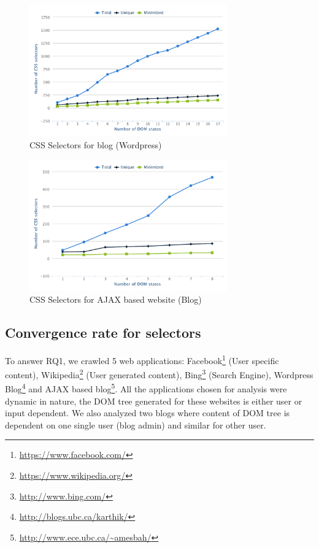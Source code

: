 	\begin{figure}
		\centering
		\includegraphics[width=85mm]{images/wordpress.pdf}
		\caption{CSS Selectors for blog (Wordpress)}
		\label{Fig:Wordpress}
	\end{figure}
	\begin{figure}
		\centering
		\includegraphics[width=85mm]{images/ajax.pdf}
		\caption{CSS Selectors for AJAX based website (Blog)}
		\label{Fig:AJAX}
	\end{figure}
	
	\subsection{Convergence rate for \css selectors}
	\label{Sec:Convergence}
	To answer RQ1, we crawled 5 web applications: Facebook\footnote{\url{https://www.facebook.com/}} (User specific content), Wikipedia\footnote{\url{https://www.wikipedia.org/}} (User generated content), Bing\footnote{\url{http://www.bing.com/}} (Search Engine), Wordpress Blog\footnote{\url{http://blogs.ubc.ca/karthik/}} and AJAX based blog\footnote{\url{http://www.ece.ubc.ca/~amesbah/}}. All the applications chosen for analysis were dynamic in nature, \ie the DOM tree generated for these websites is either user or input dependent. We also analyzed two blogs where content of DOM tree is dependent on one single user (blog admin) and similar for other user. 
	
